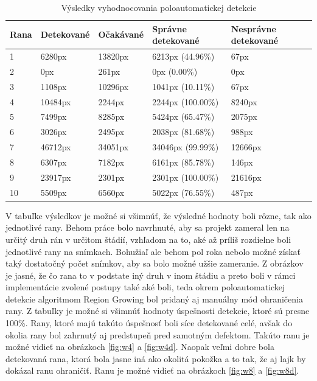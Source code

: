 \begin{table}[h]
\centering
\label{tab:result}
\begin{tabular}{|l|l|l|l|l|}
\hline
Rana & Detekované & Očakávané & Správne detekované & Nesprávne detekované \\ \hline
1    & 6280px               & 13820px           & 6213px (44.96\%)    & 67px         \\ \hline
2    & 0px                  & 261px             & 0px (0.00\%)        & 0px          \\ \hline
3    & 1108px               & 10296px           & 1041px (10.11\%)    & 67px         \\ \hline
4    & 10484px              & 2244px            & 2244px (100.00\%)   & 8240px     \\ \hline
5    & 7499px               & 8285px            & 5424px (65.47\%)    & 2075px      \\ \hline
6    & 3026px               & 2495px            & 2038px (81.68\%)    & 988px       \\ \hline
7    & 46712px              & 34051px           & 34046px (99.99\%)   & 12666px     \\ \hline
8    & 6307px               & 7182px            & 6161px (85.78\%)    & 146px        \\ \hline
9    & 23917px              & 2301px            & 2301px (100.00\%)   & 21616px    \\ \hline
10   & 5509px               & 6560px            & 5022px (76.55\%)    & 487px        \\ \hline
\end{tabular}
\caption{Výsledky vyhodnocovania poloautomatickej detekcie}
\end{table}
V tabuľke výsledkov je možné si všimnúť, že výsledné hodnoty boli rôzne, tak ako jednotlivé rany. Behom práce bolo navrhnuté, aby sa projekt zameral len na určitý druh rán v určitom štádií, vzhľadom na to, aké až príliš rozdielne boli jednotlivé rany na snímkach. Bohužiaľ ale behom pol roka nebolo možné získať taký dostatočný počet snímkov, aby sa bolo možné užšie zameranie. Z obrázkov je jasné, že čo rana to v podstate iný druh v inom štádiu a preto boli v rámci implementácie zvolené postupy také aké boli, teda okrem poloautomatickej detekcie algoritmom Region Growing bol pridaný aj manuálny mód ohraničenia rany. Z tabuľky je možné si všimnúť hodnoty úspešnosti detekcie, ktoré sú presne 100\%. Rany, ktoré majú takúto úspešnosť boli síce detekované celé, avšak do okolia rany bol zahrnutý aj predstupeň pred samotným defektom. Takúto ranu je možné vidieť na obrázkoch \ref{fig:w4} a \ref{fig:w4d}. Naopak veľmi dobre bola detekovaná rana, ktorá bola jasne iná ako okolitá pokožka a to tak, že aj lajk by dokázal ranu ohraničiť. Ranu je možné vidieť na obrázkoch \ref{fig:w8} a \ref{fig:w8d}.

